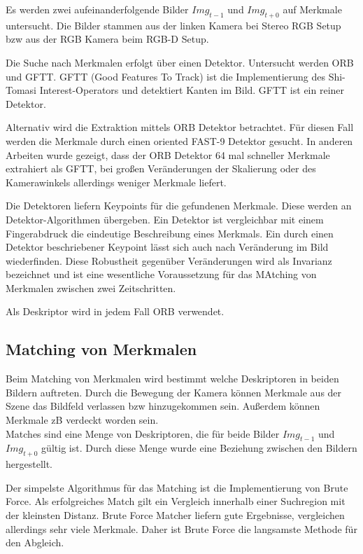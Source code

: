 Es werden zwei aufeinanderfolgende Bilder $Img_{t-1}$ und $Img_{t+0}$ auf Merkmale untersucht. Die Bilder stammen aus der linken Kamera bei Stereo RGB Setup bzw aus der RGB Kamera beim RGB-D Setup.
\newline

Die Suche nach Merkmalen erfolgt über einen Detektor. Untersucht werden ORB und GFTT. GFTT (Good Features To Track) ist die Implementierung des Shi-Tomasi Interest-Operators und detektiert Kanten im Bild. GFTT ist ein reiner Detektor.

Alternativ wird die Extraktion mittels ORB Detektor betrachtet. Für diesen Fall werden die Merkmale durch einen oriented FAST-9 Detektor gesucht. In anderen Arbeiten wurde gezeigt, dass der ORB Detektor 64 mal schneller Merkmale extrahiert als GFTT, bei gro{\ss}en Veränderungen der Skalierung oder des Kamerawinkels allerdings weniger Merkmale liefert.\cite{Mouats.PerfD}
\newline

Die Detektoren liefern Keypoints für die gefundenen Merkmale. Diese werden an Detektor-Algorithmen übergeben. Ein Detektor ist vergleichbar mit einem Fingerabdruck die eindeutige Beschreibung eines Merkmals. Ein durch einen Detektor beschriebener Keypoint lässt sich auch nach Veränderung im Bild wiederfinden. Diese Robustheit gegenüber Veränderungen wird als Invarianz bezeichnet und ist eine wesentliche Voraussetzung für das MAtching von Merkmalen zwischen zwei Zeitschritten.

Als Deskriptor wird in jedem Fall ORB verwendet.
%
\subsection{Matching von Merkmalen}
Beim Matching von Merkmalen wird bestimmt welche Deskriptoren in beiden Bildern auftreten. Durch die Bewegung der Kamera können Merkmale aus der Szene das Bildfeld verlassen bzw hinzugekommen sein. Au{\ss}erdem können Merkmale zB verdeckt  worden sein.\\
Matches sind eine Menge von Deskriptoren, die für beide Bilder $Img_{t-1}$ und $Img_{t+0}$ gültig ist. Durch diese Menge wurde eine Beziehung zwischen den Bildern hergestellt.


Der simpelste Algorithmus für das Matching ist die Implementierung von Brute Force. Als erfolgreiches Match gilt ein Vergleich innerhalb einer Suchregion mit der kleinsten Distanz. Brute Force Matcher liefern gute Ergebnisse, vergleichen allerdings sehr viele Merkmale. Daher ist Brute Force die langsamste Methode für den Abgleich.
\newline

